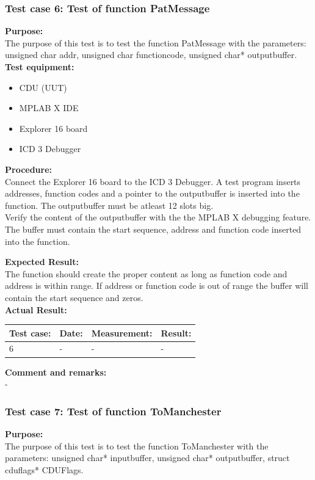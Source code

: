 \subsubsection{Test case 6: Test of function PatMessage }
\textbf{Purpose:}\\
The purpose of this test is to test the function PatMessage with the parameters: unsigned char addr, unsigned char functioncode, unsigned char* outputbuffer.\\

\textbf{Test equipment:}
\begin{itemize}
\item CDU (UUT)
\item MPLAB X IDE
\item Explorer 16 board
\item ICD 3 Debugger
\end{itemize}

\textbf{Procedure:}\\
Connect the Explorer 16 board to the ICD 3 Debugger. A test program inserts addresses, function codes and a pointer to the outputbuffer is inserted into the function. The outputbuffer must be atleast 12 slots big.\\
Verify the content of the outputbuffer with the the MPLAB X debugging feature. The buffer must contain the start sequence, address and function code inserted into the function.

\textbf{Expected Result:}\\
The function should create the proper content as long as function code and address is within range. If address or function code is out of range the buffer will contain the start sequence and zeros.\\

\textbf{Actual Result:}\\
\begin{table}[H]
\centering
\begin{tabular}{|p{2cm}|p{2cm}|p{3cm}|p{2cm}|}\hline
\textbf{Test case:} & \textbf{Date:} & \textbf{Measurement:} & \textbf{Result:} \\ \hline
6 & - & - & - \\ \hline
\end{tabular}
\end{table}

\textbf{Comment and remarks:}\\
-\\

\subsubsection{Test case 7: Test of function ToManchester }
\textbf{Purpose:}\\
The purpose of this test is to test the function ToManchester with the parameters: unsigned char* inputbuffer, unsigned char* outputbuffer, struct cduflags* CDUFlags.\\

